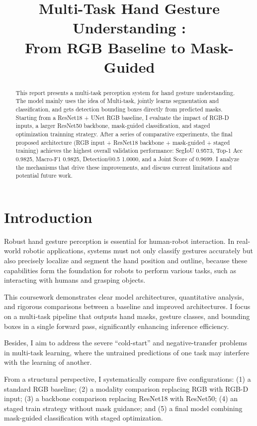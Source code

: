 \documentclass[conference]{IEEEtran}
\title{Multi-Task Hand Gesture Understanding :\\
From RGB Baseline to Mask-Guided }
\author{
\IEEEauthorblockN{Tianhao Liang}
\IEEEauthorblockA{
COMP0248 Coursework 1\\
}
}
\begin{document}
\maketitle

\begin{abstract}
This report presents a multi-task perception system for hand gesture understanding. The model mainly uses the idea of Multi-task, jointly learns segmentation and classification, and gets detection bounding boxes directly from predicted masks. Starting from a ResNet18 + UNet RGB baseline, I evaluate the impact of RGB-D inputs, a larger ResNet50 backbone, mask-guided classification, and staged optimization trainning strategy. After a series of comparative experiments, the final proposed architecture (RGB input + ResNet18 backbone + mask-guided + staged training) achieves the highest overall validation performance: SegIoU 0.9573, Top-1 Acc 0.9825, Macro-F1 0.9825, Detection@0.5 1.0000, and a Joint Score of 0.9699. I analyze the mechanisms that drive these improvements, and discuss current limitations and potential future work.
\end{abstract}

\section{Introduction}
Robust hand gesture perception is essential for human-robot interaction. In real-world robotic applications, systems must not only classify gestures accurately but also precisely localize and segment the hand position and outline, because these capabilities form the foundation for robots to perform various tasks, such as interacting with humans and grasping objects.

This coursework demonstrates clear model architectures, quantitative analysis, and rigorous comparisons between a baseline and improved architectures. I focus on a multi-task pipeline that outputs hand masks, gesture classes, and bounding boxes in a single forward pass, significantly enhancing inference efficiency.

Besides, I aim to address the severe ``cold-start'' and negative-transfer problems in multi-task learning, where the untrained predictions of one task may interfere with the learning of another. 

From a structural perspective, I systematically compare five configurations: (1) a standard RGB baseline; (2) a modality comparison replacing RGB with RGB-D input; (3) a backbone comparison replacing ResNet18 with ResNet50; (4) an staged train strategy without mask guidance; and (5) a final model combining mask-guided classification with staged optimization. 
\end{document}
